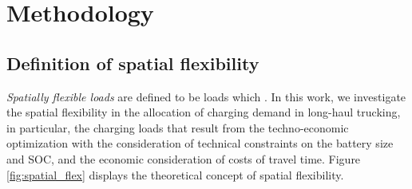 \documentclass[preprint,10pt,review, authoryear]{elsarticle}
\begin{document}
    
    
    \newpage
\section{Methodology}

    \subsection{Definition of spatial flexibility}
    \textit{Spatially flexible loads} are defined to be loads which  \citep{gu2025competitiveequilibriumelectricitymarkets}. In this work, we investigate the spatial flexibility in the allocation of charging demand in long-haul trucking, in particular, the  charging loads that result from the techno-economic optimization with the consideration of technical constraints on the battery size and SOC, and the economic consideration of costs of travel time. Figure \ref{fig:spatial_flex} displays the theoretical concept of spatial flexibility. 
\end{document}

